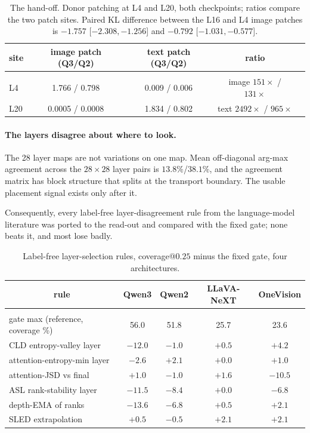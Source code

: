 \begin{table}[t]
\caption{The hand-off. Donor patching at L4 and L20, both checkpoints; ratios compare the two patch sites. Paired
KL difference between the L16 and L4 image patches is $-1.757$ [$-2.308,-1.256$] and $-0.792$ [$-1.031,-0.577$].}
\label{tab:handoff}
\begin{center}
\small
\begin{tabular}{lcccc}
\multicolumn{1}{c}{\bf site} &\multicolumn{1}{c}{\bf image patch (Q3/Q2)} &\multicolumn{1}{c}{\bf text patch (Q3/Q2)} &\multicolumn{1}{c}{\bf ratio}
\\ \hline \\
L4 & 1.766 / 0.798 & 0.009 / 0.006 & image $151\times$ / $131\times$\\
L20 & 0.0005 / 0.0008 & 1.834 / 0.802 & text $2492\times$ / $965\times$\\
\end{tabular}
\end{center}
\end{table}

\paragraph{The layers disagree about where to look.} The 28 layer maps are not variations on one map. Mean off-diagonal
arg-max agreement across the $28\times28$ layer pairs is $13.8\%$/$38.1\%$, and the agreement matrix has block
structure that splits at the transport boundary. The usable placement signal exists only after it.


Consequently, every label-free layer-disagreement rule from the language-model literature was ported to the
read-out and compared with the fixed gate; none beats it, and most lose badly.

\begin{table}[t]
\caption{Label-free layer-selection rules, coverage@$0.25$ minus the fixed gate, four architectures.}
\label{tab:rules}
\begin{center}
\small
\begin{tabular}{lcccc}
\multicolumn{1}{c}{\bf rule} &\multicolumn{1}{c}{\bf Qwen3} &\multicolumn{1}{c}{\bf Qwen2} &\multicolumn{1}{c}{\bf LLaVA-NeXT} &\multicolumn{1}{c}{\bf OneVision}
\\ \hline \\
gate max (reference, coverage \%) & 56.0 & 51.8 & 25.7 & 23.6\\
CLD entropy-valley layer & $-12.0$ & $-1.0$ & $+0.5$ & $+4.2$\\
attention-entropy-min layer & $-2.6$ & $+2.1$ & $+0.0$ & $+1.0$\\
attention-JSD vs final & $+1.0$ & $-1.0$ & $+1.6$ & $-10.5$\\
ASL rank-stability layer & $-11.5$ & $-8.4$ & $+0.0$ & $-6.8$\\
depth-EMA of ranks & $-13.6$ & $-6.8$ & $+0.5$ & $+2.1$\\
SLED extrapolation & $+0.5$ & $-0.5$ & $+2.1$ & $+2.1$\\
\end{tabular}
\end{center}
\end{table}

